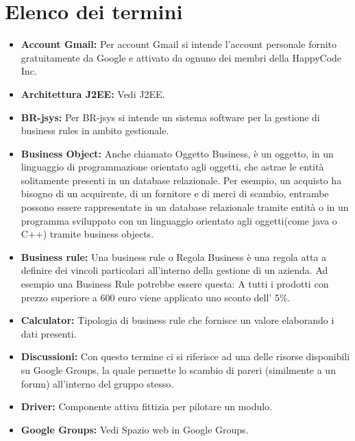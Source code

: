 \documentclass[11pt,titlepage,a4paper]{report}
\begin{document}
\chapter{Elenco dei termini}
\begin{itemize}

\item{\textbf{Account Gmail:}
Per account Gmail si intende l'account personale fornito gratuitamente da Google e attivato da ognuno dei membri della HappyCode Inc.}

\item{\textbf{Architettura J2EE:}
Vedi J2EE.}

\item{\textbf{BR-jsys:}
Per BR-jsys si intende un sistema software per la gestione di business rules in ambito gestionale.}

\item{\textbf{Business Object:}
Anche chiamato Oggetto Business, \`e un oggetto, in un linguaggio di programmazione orientato agli oggetti, che astrae le entit\`a solitamente presenti in un database relazionale.
Per esempio, un acquisto ha bisogno di un acquirente, di un fornitore e di merci di scambio, entrambe possono essere rappresentate in un database relazionale tramite entit\`a o in un programma sviluppato con un linguaggio orientato agli oggetti(come java o C++) tramite business objects.}

\item{\textbf{Business rule:}
Una business rule o Regola Business \`e una regola atta a definire dei vincoli particolari all'interno della gestione di un azienda. Ad esempio una Business Rule potrebbe essere questa: A tutti i prodotti con prezzo superiore a 600 euro  viene applicato uno sconto dell' 5\%.}

\item{\textbf{Calculator:}
Tipologia di business rule che fornisce un valore elaborando i dati presenti.}

\item{\textbf{Discussioni:}
Con questo termine ci si riferisce ad una delle risorse disponibili su Google Groups, la quale permette lo scambio di pareri (similmente a un forum) all'interno del gruppo stesso.}

\item{\textbf{Driver:}
Componente attiva fittizia per pilotare un modulo.}

\item{\textbf{Google Groups:}
Vedi Spazio web in Google Groups. }


\end{itemize}
\end{document}
